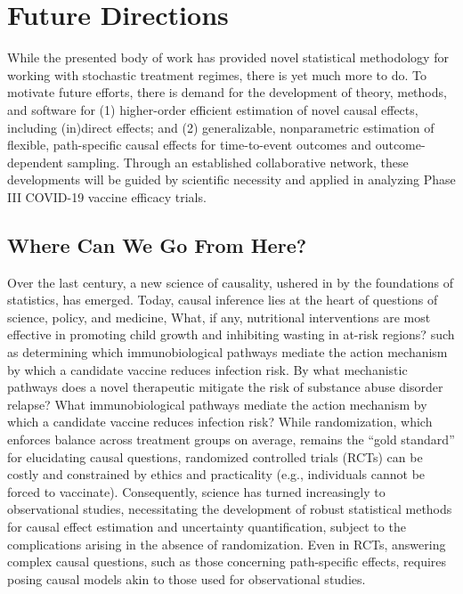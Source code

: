 \chapter{Future Directions}\label{six}

While the presented body of work has provided novel statistical methodology for
working with stochastic treatment regimes, there is yet much more to do. To
motivate future efforts, there is demand for the development of theory, methods,
and software for (1) higher-order efficient estimation of novel causal effects,
including (in)direct effects; and (2) generalizable, nonparametric estimation of
flexible, path-specific causal effects for time-to-event outcomes and
outcome-dependent sampling. Through an established collaborative network, these
developments will be guided by scientific necessity and applied in analyzing
Phase III COVID-19 vaccine efficacy trials.

\section{Where Can We Go From Here?}

Over the last century, a new science of causality, ushered in by the foundations
of statistics, has emerged. Today, causal inference lies at the heart of
questions of science, policy, and medicine, What, if any, nutritional
interventions are most effective in promoting child growth and inhibiting
wasting in at-risk regions? such as determining which immunobiological pathways
mediate the action mechanism by which a candidate vaccine reduces infection
risk. By what mechanistic pathways does a novel therapeutic mitigate the risk of
substance abuse disorder relapse? What immunobiological pathways mediate the
action mechanism by which a candidate vaccine reduces infection risk? While
randomization, which enforces balance across treatment groups on average,
remains the ``gold standard'' for elucidating causal questions, randomized
controlled trials (RCTs) can be costly and constrained by ethics and
practicality (e.g., individuals cannot be forced to vaccinate). Consequently,
science has turned increasingly to observational studies, necessitating the
development of robust statistical methods for causal effect estimation and
uncertainty quantification, subject to the complications arising in the absence
of randomization. Even in RCTs, answering complex causal questions, such as
those concerning path-specific effects, requires posing causal models akin to
those used for observational studies.

